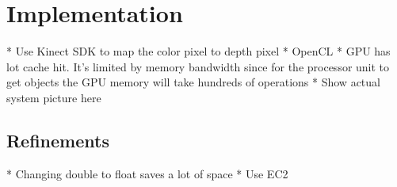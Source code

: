 \section{Implementation}
* Use Kinect SDK to map the color pixel to depth pixel
* OpenCL
* GPU has lot cache hit. It's limited by memory bandwidth since for the processor unit to get objects the GPU memory will take hundreds of operations
* Show actual system picture here
\subsection{Refinements}
* Changing double to float saves a lot of space
* Use EC2